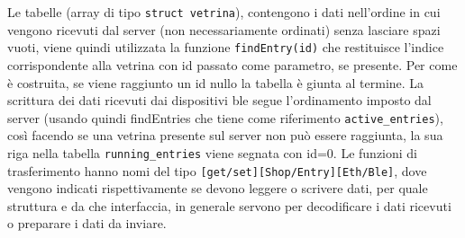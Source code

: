 \documentclass{article}
\begin{document}
Le tabelle (array di tipo \texttt{struct vetrina}), contengono i dati nell'ordine in cui vengono ricevuti dal server (non necessariamente ordinati) senza lasciare spazi vuoti, viene quindi utilizzata la funzione \texttt{findEntry(id)} che restituisce l'indice corrispondente alla vetrina con id passato come parametro, se presente. Per come \`{e} costruita, se viene raggiunto un id nullo la tabella \`{e} giunta al termine. La scrittura dei dati ricevuti dai dispositivi ble segue l'ordinamento imposto dal server (usando quindi findEntries che tiene come riferimento \texttt{active\_entries}), cos\`{i} facendo se una vetrina presente sul server non pu\`{o} essere raggiunta, la sua riga nella tabella \texttt{running\_entries} viene segnata con id=0.
Le funzioni di trasferimento hanno nomi del tipo \texttt{[get/set][Shop/Entry][Eth/Ble]}, dove vengono indicati rispettivamente se devono leggere o scrivere dati, per quale struttura e da che interfaccia, in generale servono per decodificare i dati ricevuti o preparare i dati da inviare.
\end{document}
